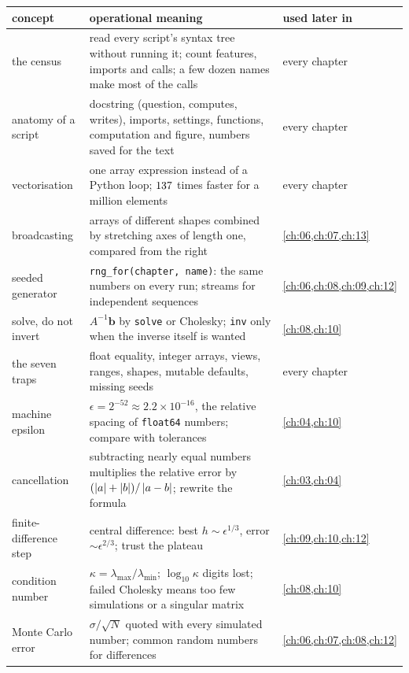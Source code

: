 \begin{center}
\small
\renewcommand{\arraystretch}{1.15}
\begin{tabularx}{\linewidth}{@{}>{\raggedright\arraybackslash}p{3.2cm}
                               >{\raggedright\arraybackslash}X
                               >{\raggedright\arraybackslash}p{2.5cm}@{}}
\toprule
concept & operational meaning & used later in\\\midrule
the census & read every script's syntax tree without running it; count features, imports and calls; a few dozen names make most of the calls & every chapter\\
anatomy of a script & docstring (question, computes, writes), imports, settings, functions, computation and figure, numbers saved for the text & every chapter\\
vectorisation & one array expression instead of a Python loop; $137$ times faster for a million elements & every chapter\\
broadcasting & arrays of different shapes combined by stretching axes of length one, compared from the right & \cref{ch:06,ch:07,ch:13}\\
seeded generator & \texttt{rng\_for(chapter, name)}: the same numbers on every run; streams for independent sequences & \cref{ch:06,ch:08,ch:09,ch:12}\\
solve, do not invert & $A^{-1}\bm b$ by \texttt{solve} or Cholesky; \texttt{inv} only when the inverse itself is wanted & \cref{ch:08,ch:10}\\
the seven traps & float equality, integer arrays, views, ranges, shapes, mutable defaults, missing seeds & every chapter\\
machine epsilon & $\epsilon=2^{-52}\approx2.2\times10^{-16}$, the relative spacing of \texttt{float64} numbers; compare with tolerances & \cref{ch:04,ch:10}\\
cancellation & subtracting nearly equal numbers multiplies the relative error by $(\left\lvert a\right\rvert+\left\lvert b\right\rvert)/\left\lvert a-b\right\rvert$; rewrite the formula & \cref{ch:03,ch:04}\\
finite-difference step & central difference: best $h\sim\epsilon^{1/3}$, error $\sim\epsilon^{2/3}$; trust the plateau & \cref{ch:09,ch:10,ch:12}\\
condition number & $\kappa=\lambda_{\max}/\lambda_{\min}$; $\log_{10}\kappa$ digits lost; failed Cholesky means too few simulations or a singular matrix & \cref{ch:08,ch:10}\\
Monte Carlo error & $\sigma/\sqrt N$ quoted with every simulated number; common random numbers for differences & \cref{ch:06,ch:07,ch:08,ch:12}\\

\end{tabularx}
\end{center}
